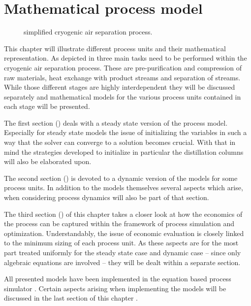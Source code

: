 \chapter{Mathematical process model}
\label{sec:mathprocess}
    \begin{figure}
        \center 
        \footnotesize
        
        \caption{simplified cryogenic air separation process.}
        \label{fig:asu_simple}
    \end{figure}

    This chapter will illustrate different process units and their mathematical representation.
    As depicted in  three main tasks need to be performed within the cryogenic air separation process.
    These are pre-purification and compression of raw materials, heat exchange with product streams and separation of streams.
    While those different stages are highly interdependent they will be discussed separately and mathematical
    models for the various process units contained in each stage will be presented.

    The first section () deals with a steady state version of the process model. Especially
    for steady state models the issue of initializing the variables in such a way that the solver can converge to a solution
    becomes crucial. With that in mind the strategies developed to initialize in particular the distillation columns will also
    be elaborated upon.

    The second section () is devoted to a dynamic version of the models for some process units.
    In addition to the models themselves several aspects which arise, when considering process dynamics will also be part
    of that section.

    The third section () of this chapter takes a closer look at how the economics of the process
    can be captured within the framework of process simulation and optimization. Understandably, the issue of economic
    evaluation is closely linked to the minimum sizing of each process unit. As these aspects are for the most
    part treated uniformly for the steady state case and dynamic case -- since only algebraic equations are involved --
    they will be dealt within a separate section.

    All presented models have been implemented in the equation based process simulator \gproms. Certain aspects arising when
    implementing the models will be discussed in the last section of this chapter .


